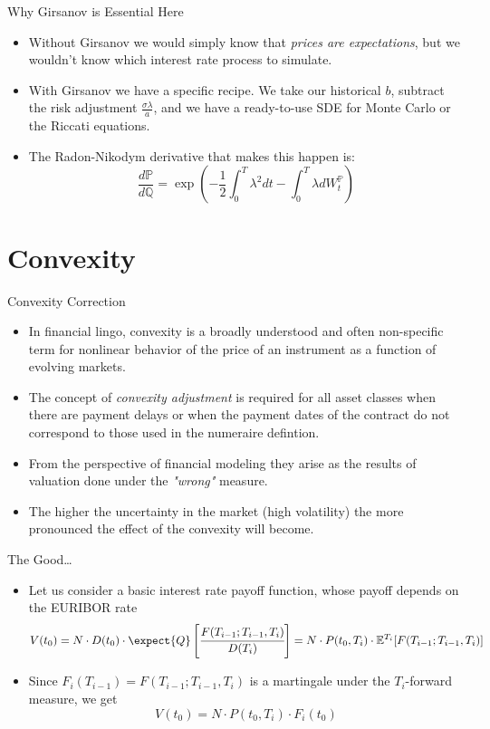 \documentclass{beamer}
\begin{document}
\begin{frame}{Why Girsanov is Essential Here}
	\begin{itemize}
		\item Without Girsanov we would simply know that \emph{prices are expectations}, but we wouldn't know which interest rate process to simulate.
		\item With Girsanov we have a specific recipe. We take our historical $b$, subtract the risk adjustment $\frac{\sigma\lambda}{a}$, and we have a ready-to-use SDE for Monte Carlo or the Riccati equations.
		\item The Radon-Nikodym derivative that makes this happen is:
		\begin{equation*}
			\frac{d\mathbb{P}}{d\mathbb{Q}}=\exp\left(-\frac{1}{2}\int_0^T\lambda^2 dt - \int_0^T\lambda dW_t^\mathbb{P}\right)
		\end{equation*}
	\end{itemize}
\end{frame}

\section{Convexity}
\begin{frame}{Convexity Correction}
	\begin{itemize}
		\item<1-> In financial lingo, convexity is a broadly understood and often non-specific term for nonlinear behavior of the price of an instrument as a function of evolving markets.
		\item<2-> The concept of \emph{convexity adjustment} is required for all asset classes when there are payment delays or when the payment dates of the contract do
		not correspond to those used in the numeraire defintion.
		\item<3-> From the perspective of financial modeling they arise as the results of valuation done under the \emph{"wrong"} measure.
		\item<4-> The higher the uncertainty in the market (high volatility) the more pronounced the effect of the convexity will become.
	\end{itemize}
\end{frame}

\begin{frame}{The Good\ldots}
	\begin{itemize}
		\item<1-> Let us consider a basic interest rate payoff function, whose payoff depends on the EURIBOR rate
		\begin{equation*}
			V(t_0) = N\cdot D(t_0)\cdot\expect{Q}\left[\cfrac{F(T_{i-1};T_{i-1},T_i)}{D(T_i)}\right]=
			N\cdot P(t_0,T_i)\cdot\mathbb{E}^{T_i}[F(T_{i-1};T_{i-1},T_i)]
		\end{equation*}
		\item<2-> Since $F_{i}(T_{i-1}) = F(T_{i-1};T_{i-1}, T_i)$ is a martingale under the $T_i$-forward measure, we get
		\begin{equation*}
			V(t_0)= N\cdot P(t_0,T_i)\cdot F_i(t_0)
		\end{equation*}
	\end{itemize}
\end{frame}
\end{document}
